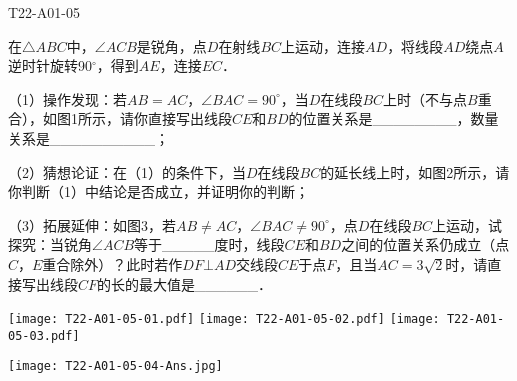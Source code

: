 \begin{defproblem}{T22-A01-05}%
\begin{onlyproblem}%
在$\triangle ABC$中，$\angle ACB$是锐角，点$D$在射线$BC$上运动，连接$AD$，将线段$AD$绕点$A$逆时针旋转90$^{\circ }$，得到$AE$，连接$EC$．

（1）操作发现：若$AB=AC$，$\angle BAC =90^{\circ }$，当$D$在线段$BC$上时（不与点$B$重合），如图1所示，请你直接写出线段$CE$和$BD$的位置关系是{\_}{\_}{\_}{\_}{\_}{\_}{\_}{\_}，数量关系是{\_}{\_}{\_}{\_}{\_}{\_}{\_}{\_}{\_}{\_}；

（2）猜想论证：在（1）的条件下，当$D$在线段$BC$的延长线上时，如图2所示，请你判断（1）中结论是否成立，并证明你的判断；

（3）拓展延伸：如图3，若$AB \ne  AC$，$\angle  BAC \ne 90^{\circ }$，点$D$在线段$BC$上运动，试探究：当锐角$\angle  ACB$等于{\_}{\_}{\_}{\_}{\_}度时，线段$CE$和$BD$之间的位置关系仍成立（点$C$，$E$重合除外）？此时若作$DF \bot  AD$交线段$CE$于点$F$，且当$AC=3\sqrt 2 $时，请直接写出线段$CF$的长的最大值是{\_}{\_}{\_}{\_}{\_}{\_}．

\begin{center}
\texttt{[image: T22-A01-05-01.pdf]}\qquad
\texttt{[image: T22-A01-05-02.pdf]}\qquad
\texttt{[image: T22-A01-05-03.pdf]}
\end{center}

\end{onlyproblem}%
\begin{onlysolution}%
\begin{center}
\texttt{[image: T22-A01-05-04-Ans.jpg]}
\end{center}
\end{onlysolution}%
\end{defproblem}






